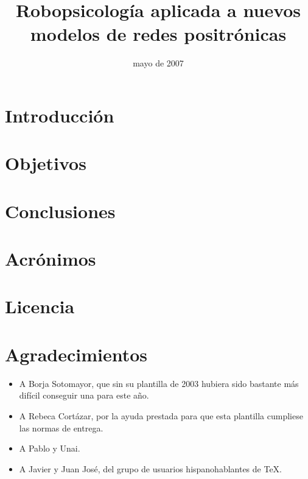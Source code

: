 \documentclass{memoriaPFC}
\title{Robopsicología aplicada a nuevos modelos de redes positrónicas}
\date{mayo de 2007}
\begin{document}
\frontmatter
\hacerportada
\hacerresumen
\tableofcontents
\listoffigures %
\listoftables %
\lstlistoflistings %

\mainmatter
\chapter{Introducción}


\chapter{Objetivos}

\chapter{Conclusiones}

\backmatter
\appendix
\chapter{Acrónimos}

\chapter{Licencia}



\chapter{Agradecimientos}

\begin{itemize}
 \item A Borja Sotomayor, que sin su plantilla de 2003 hubiera sido bastante más difícil conseguir una para este año.
 \item A Rebeca Cortázar, por la ayuda prestada para que esta plantilla cumpliese las normas de entrega.
 \item A Pablo y Unai.
 \item A Javier y Juan José, del grupo de usuarios hispanohablantes de \TeX{}.
\end{itemize}
\end{document}
